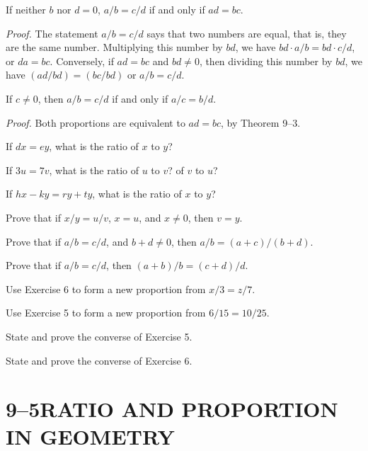 \documentclass[11pt]{book}
\begin{document}
\begin{theorem}
If neither $b$ nor $d = 0$, $a/b = c/d$ if and only if $ad = bc$.
\end{theorem}

\noindent\emph{Proof.} The statement $a/b = c/d$ says that two numbers are equal,
that is, they are the same number. Multiplying this number by $bd$, we have
$bd \cdot a/b = bd \cdot c/d$, or $da = bc$. Conversely, if $ad = bc$ and
$bd \neq 0$, then dividing this number by $bd$, we have $(ad/bd) = (bc/bd)$ or
$a/b = c/d$.

\begin{theorem}
If $c \neq 0$, then $a/b = c/d$ if and only if $a/c = b/d$.
\end{theorem}

\noindent\emph{Proof.} Both proportions are equivalent to $ad = bc$, by
Theorem 9--3.

\begin{exercisecols}
\begin{exlist}
\item If $dx = ey$, what is the ratio of $x$ to $y$?
\item If $3u = 7v$, what is the ratio of $u$ to $v$? of $v$ to $u$?
\item If $hx - ky = ry + ty$, what is the ratio of $x$ to $y$?
\item[\stex 4.] Prove that if $x/y = u/v$, $x = u$, and $x \neq 0$, then $v = y$.
\item[\stex 5.] Prove that if $a/b = c/d$, and $b + d \neq 0$, then
      $a/b = (a+c)/(b+d)$.
\item[\stex 6.] Prove that if $a/b = c/d$, then $(a+b)/b = (c+d)/d$.
\item[7.] Use Exercise 6 to form a new proportion from $x/3 = z/7$.
\item[8.] Use Exercise 5 to form a new proportion from $6/15 = 10/25$.
\item[\stex 9.] State and prove the converse of Exercise 5.
\item[\stex 10.] State and prove the converse of Exercise 6.
\end{exlist}
\end{exercisecols}

\section*{9--5\quad RATIO AND PROPORTION IN GEOMETRY}
\end{document}
